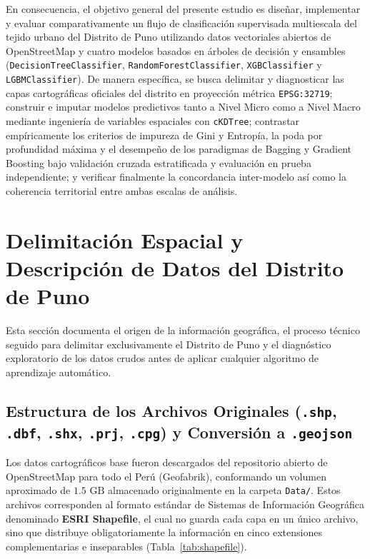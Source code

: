 \documentclass[11pt,a4paper]{article}
\begin{document}
En consecuencia, el objetivo general del presente estudio es diseñar, implementar y evaluar comparativamente un flujo de clasificación supervisada multiescala del tejido urbano del Distrito de Puno utilizando datos vectoriales abiertos de OpenStreetMap y cuatro modelos basados en árboles de decisión y ensambles (\texttt{DecisionTreeClassifier}, \texttt{RandomForestClassifier}, \texttt{XGBClassifier} y \texttt{LGBMClassifier}). De manera específica, se busca delimitar y diagnosticar las capas cartográficas oficiales del distrito en proyección métrica \texttt{EPSG:32719}; construir e imputar modelos predictivos tanto a Nivel Micro como a Nivel Macro mediante ingeniería de variables espaciales con \texttt{cKDTree}; contrastar empíricamente los criterios de impureza de Gini y Entropía, la poda por profundidad máxima y el desempeño de los paradigmas de Bagging y Gradient Boosting bajo validación cruzada estratificada y evaluación en prueba independiente; y verificar finalmente la concordancia inter-modelo así como la coherencia territorial entre ambas escalas de análisis.
\newpage
\section{Delimitación Espacial y Descripción de Datos del Distrito de Puno}
\label{sec:delimitacion}

Esta sección documenta el origen de la información geográfica, el proceso técnico seguido para delimitar exclusivamente el Distrito de Puno y el diagnóstico exploratorio de los datos crudos antes de aplicar cualquier algoritmo de aprendizaje automático.

\subsection{Estructura de los Archivos Originales (\texttt{.shp}, \texttt{.dbf}, \texttt{.shx}, \texttt{.prj}, \texttt{.cpg}) y Conversión a \texttt{.geojson}}

Los datos cartográficos base fueron descargados del repositorio abierto de OpenStreetMap para todo el Perú (Geofabrik), conformando un volumen aproximado de $1.5\text{ GB}$ almacenado originalmente en la carpeta \texttt{Data/}. Estos archivos corresponden al formato estándar de Sistemas de Información Geográfica denominado \textbf{ESRI Shapefile}, el cual no guarda cada capa en un único archivo, sino que distribuye obligatoriamente la información en cinco extensiones complementarias e inseparables (Tabla~\ref{tab:shapefile}).
\end{document}

